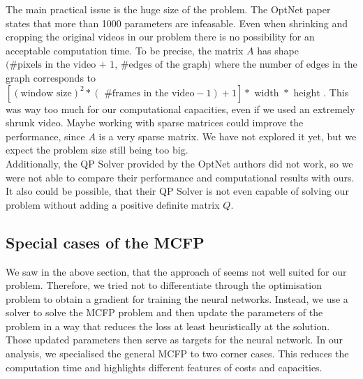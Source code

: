 \documentclass{article}
\begin{document}
{The main practical issue is the huge size of the problem. The OptNet paper states that more than 1000 parameters are infeasable. Even when shrinking and cropping the original videos in our problem there is no possibility for an acceptable computation time. To be precise, the matrix $A$ has shape $ \big(\text{\# pixels in the video + 1, \# edges of the graph}\big)$
where the number of edges in the graph corresponds to $[(\text{window size})^2  * (\text{ \# frames in the video}-1) + 1]* \text{ width } * \text{ height }.$ This was way too much for our computational capacities, even if we used an extremely shrunk video. 
Maybe working with sparse matrices could improve the performance, since $A$ is a very sparse matrix. We have not explored it yet, but we expect the problem size still being too big.\\
Additionally, the QP Solver provided by the OptNet authors did not work, so we were not able to compare their performance and computational results with ours. It also could be possible, that their QP Solver is not even capable of solving our problem without adding a positive definite matrix $Q$.

\subsection{Special cases of the MCFP}\label{specialMCFP}
We saw in the above section, that the approach of \cite{AmosK17} seems not well suited for our problem. Therefore, we tried not to differentiate through the optimisation problem to obtain a gradient for training the neural networks. Instead, we use a solver to solve the MCFP problem and then update the parameters of the problem in a way that reduces the loss at least heuristically at the solution. Those updated parameters then serve as targets for the neural network. In our analysis, we specialised the general MCFP to two corner cases. This reduces the computation time and highlights different features of costs and capacities.


}
\end{document}
